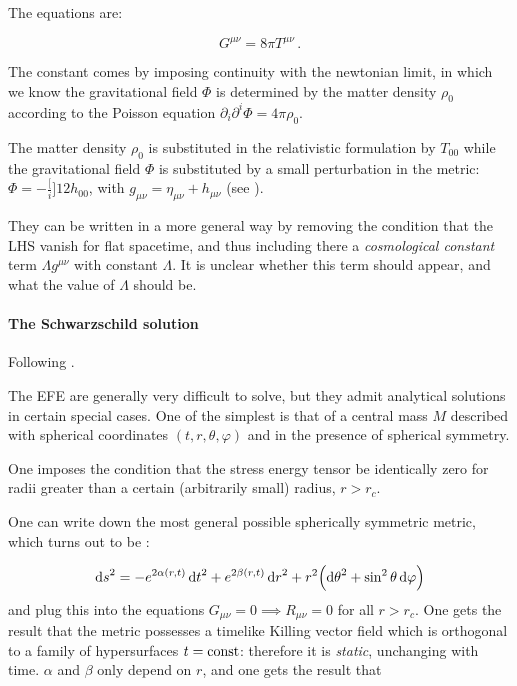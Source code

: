 \documentclass[main.tex]{subfiles}
\begin{document}
The equations are:

\begin{equation} \label{eq:EFE}
  G^{\mu\nu} = 8 \pi T^{\mu\nu} \,.
\end{equation}

The constant comes by imposing continuity with the newtonian limit, in which we know the gravitational field \(\Phi\) is determined by the matter density \(\rho_0\) according to the Poisson equation \(\partial_i \partial^i \Phi = 4 \pi \rho_0\).

The matter density \(\rho_0\) is substituted in the relativistic formulation by \(T_{00}\) while the gravitational field \(\Phi\) is substituted by a small perturbation in the metric: \(\Phi = -\frac[i]{1}{2}  h_{00}\), with \(g_{\mu \nu} = \eta_{\mu\nu} + h_{\mu\nu}\) (see \cite[eq. 4.46]{Carroll:1997ar}).

They can be written in a more general way by removing the condition that the LHS vanish for flat spacetime, and thus including there a \emph{cosmological constant}  term \(\Lambda g^{\mu\nu}\) with constant \(\Lambda\).
It is unclear whether this term should appear, and what the value of \(\Lambda\) should be.

\paragraph{The Schwarzschild solution}

Following \cite[section 7]{Carroll:1997ar}.

The EFE are generally very difficult to solve, but they admit analytical solutions in certain special cases.
One of the simplest is that of a central mass \(M\) described with spherical coordinates \((t, r, \theta, \varphi)\) and in the presence of spherical symmetry.

One imposes the condition that the stress energy tensor be identically zero for radii greater than a certain (arbitrarily small) radius, \(r > r_c\).

One can write down the most general possible spherically symmetric metric, which turns out to be \cite[eq. 7.13]{Carroll:1997ar}:

\begin{equation}
  \dd{s} ^2 = -e^{2 \alpha(r, t)} \dd{t}^2 + e^{2 \beta(r, t)} \dd{r}^2
  + r^2 \qty(\dd{\theta}^2 + \sin^2\theta \dd{\varphi})
\end{equation}
and plug this into the equations \(G_{\mu\nu} = 0 \implies R_{\mu\nu} = 0 \) for all \(r>r_c\). One gets the result that the metric possesses a timelike Killing vector field which is orthogonal to a family of hypersurfaces \(t = \operatorname{const}\): therefore it is \emph{static}, unchanging with time.
\(\alpha\) and \(\beta\) only depend on \(r\), and one gets the result that
\end{document}
